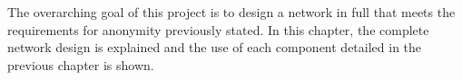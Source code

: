 \documentclass[ %
                    author={Luke Murray},
                supervisor={Dr. Simon Hollis},
                     title={Shadow Peer-to-Peer Networks},
                  subtitle={},
                    degree={MEng},
                      year={2013} ]{thesis}
\begin{document}

The overarching goal of this project is to design a network in full that meets the requirements for anonymity previously stated. In this chapter, the complete network design is explained and the use of each component detailed in the previous chapter is shown.
\end{document}
